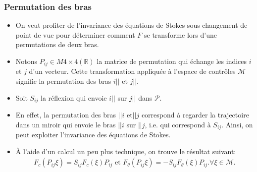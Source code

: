\documentclass[12pt,a4paper]{article}
\theoremstyle{plain}
\theoremstyle{plain}
\theoremstyle{plain}
\theoremstyle{definition}
\theoremstyle{definition}
\theoremstyle{definition}
\theoremstyle{plain}
\newcommand{\M}{\mathcal{M}}
\newcommand{\R}{\mathbb{R}}
\begin{document}
\subsubsection{Permutation des bras}
\begin{itemize}
\item On veut profiter de l'invariance des équations de Stokes sous changement de point de vue pour déterminer comment $F$ se transforme lors d'une permutations de deux bras.

\item Notons $P_{ij} \in M{4 \times 4}(\R)$ la matrice de permutation qui échange les indices $i$ et $j$ d'un vecteur. Cette transformation appliquée à l'espace de contrôles $\M$ signifie la permutation des bras $i||$ et $j||$.

\item Soit $S_{ij}$ la réflexion qui envoie $i ||$ sur $j||$ dans $\mathcal{P}$. 


\item En effet, la permutation des bras $||i$ et$||j$ correspond à regarder la trajectoire dans un miroir qui envoie le bras $||i$ sur $||j$, i.e. qui correspond à $S_{ij}$. Ainsi, on peut exploiter l'invariance des équations de Stokes.

\item À l'aide d'un calcul un peu plus technique, on trouve le résultat suivant:
\begin{align}
	 F_c(P_{ij} \xi) = S_{ij} F_c(\xi) P_{ij} \text{ et } F_{\theta}(P_{ij} \xi) = - S_{ij} F_{\theta}(\xi) P_{ij}. \forall \xi \in \M.
\end{align}



\end{itemize}
\end{document}
